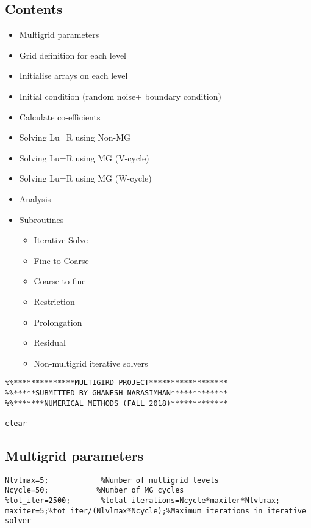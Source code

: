 \documentclass[11pt]{report}
\begin{document}
\begin{appendices}
\subsection*{Contents}

\begin{itemize}
	\setlength{\itemsep}{-1ex}
	\item Multigrid parameters
	\item Grid definition for each level
	\item Initialise arrays on each level
	\item Initial condition (random noise+ boundary condition)
	\item Calculate co-efficients
	\item Solving Lu=R using Non-MG
	\item Solving Lu=R using MG (V-cycle)
	\item Solving Lu=R using MG (W-cycle)
	\item Analysis
	\item Subroutines
	\begin{itemize}
    \item Iterative Solve
    \item Fine to Coarse
    \item Coarse to fine
    \item Restriction
    \item Prolongation
    \item Residual
    \item Non-multigrid iterative solvers
	\end{itemize}
\end{itemize}
\begin{verbatim}
%%**************MULTIGIRD PROJECT******************
%%*****SUBMITTED BY GHANESH NARASIMHAN*************
%%*******NUMERICAL METHODS (FALL 2018)*************

clear
\end{verbatim}


\subsection*{Multigrid parameters}

\begin{verbatim}
Nlvlmax=5;            %Number of multigrid levels
Ncycle=50;           %Number of MG cycles
%tot_iter=2500;       %total iterations=Ncycle*maxiter*Nlvlmax;
maxiter=5;%tot_iter/(Nlvlmax*Ncycle);%Maximum iterations in iterative solver


\end{verbatim}
\end{appendices}
\end{document}
